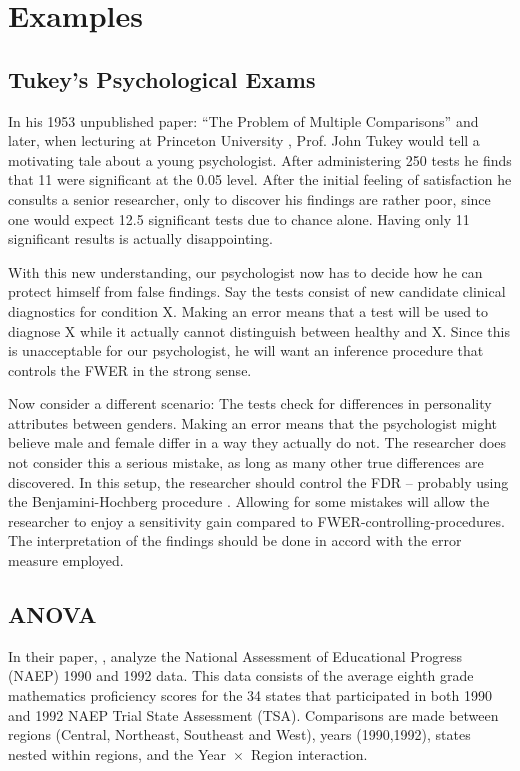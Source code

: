\documentclass[review,12pt]{article}
\begin{document}
\section{\label{sec:examples}Examples}




\subsection{Tukey's Psychological Exams}
In his 1953 unpublished paper: ``The Problem of Multiple Comparisons'' \citep{benjamini_john_2002} and later, when lecturing at Princeton University \citep{donoho_higher_2004}, Prof. John Tukey would tell a motivating tale about a young psychologist. After administering 250 tests he finds that 11 were significant at the 0.05 level. After the initial feeling of satisfaction he consults a senior researcher, only to discover his findings are rather poor, since one  would expect 12.5 significant tests due to chance alone. Having only 11 significant results is actually disappointing.


With this new understanding, our psychologist now has to decide how he can protect himself from false findings. 
Say the tests consist of new candidate clinical diagnostics for condition X. Making an error means that a test will be used to diagnose X while it actually cannot distinguish between healthy and X. Since this is unacceptable for our psychologist, he will want an inference procedure that controls the FWER in the strong sense. 


Now consider a different scenario: The tests check for differences in personality attributes between genders. Making an error means that the psychologist might believe male and female differ in a way they actually do not. The researcher does not consider this a serious mistake, as long as many other true differences are discovered. In this setup, the researcher should control the FDR -- probably using the Benjamini-Hochberg procedure \citep{benjamini_controlling_1995}. Allowing for some mistakes will allow the researcher to enjoy a sensitivity gain compared to FWER-controlling-procedures. The interpretation of the findings should be done in accord with the error measure employed.


\subsection{ANOVA}
In their \citeyear{williams_controlling_1999} paper, \citeauthor*{williams_controlling_1999}, analyze the National Assessment of Educational Progress (NAEP) 1990 and 1992 data. This data consists of the average eighth grade mathematics proficiency scores for the 34 states that participated in both 1990 and 1992 NAEP Trial State Assessment (TSA). Comparisons are made between regions (Central, Northeast, Southeast and West), years (1990,1992), states nested within regions, and the Year~$\times$~Region interaction. 
\end{document}
